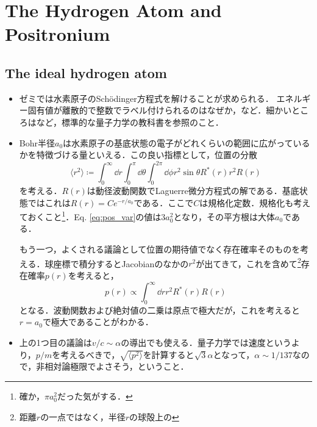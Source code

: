 \section{The Hydrogen Atom and Positronium}
\subsection{The ideal hydrogen atom}
\begin{itemize}
		\item ゼミでは水素原子のSch\"{o}dinger方程式を解けることが求められる．
				エネルギー固有値が離散的で整数でラベル付けられるのはなぜか，など．細かいところは\cite{BN10398292}など，標準的な量子力学の教科書を参照のこと．
		\item Bohr半径$a_0 $は水素原子の基底状態の電子がどれくらいの範囲に広がっているかを特徴づける量といえる．この良い指標として，位置の分散
				\begin{equation}
						\langle r^2 \rangle \coloneqq \int_{0}^{\infty}\dd{r} \int_{0}^{\pi} \dd{\theta}\int_{0}^{2\pi}\dd{\phi}r^2\sin\theta R^{*}(r)r^2R(r)\label{eq:pos_var}
				\end{equation}
				を考える．$R(r) $は動径波動関数でLaguerre微分方程式の解である．基底状態ではこれは$R(r) = Ce^{-r/a_0} $である．ここで$C $は規格化定数．規格化も考えておくこと\footnote{確か，$\pi a_0^2 $だった気がする．}．Eq. \eqref{eq:pos_var}の値は$3a_0^2 $となり，その平方根は大体$a_0 $である．

				もう一つ，よくされる議論として位置の期待値でなく存在確率そのものを考える．球座標で積分するとJacobianのなかの$r^2 $が出てきて，これを含めて\footnote{距離$r $の一点ではなく，半径$r $の球殻上の}存在確率$p(r) $を考えると，
				\begin{equation}
						p(r) \propto \int_{0}^{\infty}\dd{r}r^2R^*(r)R(r)
				\end{equation}
				となる．波動関数および絶対値の二乗は原点で極大だが，これを考えると$r=a_0 $で極大であることがわかる．
		\item 上の1つ目の議論は$v/c \sim \alpha $の導出でも使える．量子力学では速度というより，$p/m $を考えるべきで，$\sqrt{\langle p^2\rangle} $を計算すると$\sqrt{3}\alpha $となって，$\alpha \sim 1/137 $なので，非相対論極限でよさそう，ということ．
\end{itemize}
